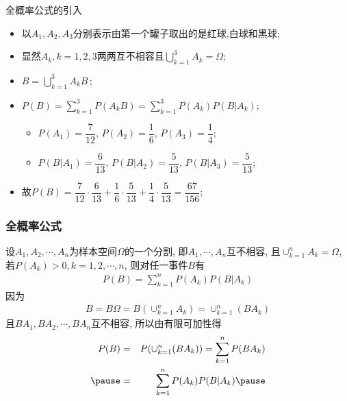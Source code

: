 \begin{frame}{全概率公式的引入}
	\begin{jieda}
	\begin{itemize}[<+-|alert@+>]
		\item 以$A_1,A_2,A_3$分别表示由第一个罐子取出的是红球,白球和黑球;
		\item 显然$A_k, k=1,2,3$两两互不相容且$\bigcup_{k=1}^3A_k=\Omega$;
		\item $B=\bigcup_{k=1}^{3}A_kB\,$;
		\item $ P(B)=\sum_{k=1}^{3} P(A_kB)=\sum_{k=1}^{3} P(A_k) P(B|A_k)$;
		\begin{itemize}
			\item $ P(A_1)=\dfrac{7}{12},\, P(A_2)=\dfrac{1}{6},\, P(A_3)=\dfrac{1}{4}$;
			\item $ P(B|A_1)=\dfrac{6}{13},\, P(B|A_2)=\dfrac{5}{13},\, P(B|A_3)=\dfrac{5}{13}$;
		\end{itemize}
	\item 故$ P(B)=\dfrac{7}{12}·\dfrac{6}{13}+\dfrac{1}{6}·\dfrac{5}{13}+\dfrac{1}{4}·\dfrac{5}{13}=\dfrac{67}{156};$
	\end{itemize}
	\end{jieda}
\end{frame}

\begin{frame}
  \frametitle{全概率公式}
  \begin{thm}[\textcolor{red}{全概率公式}] 设$A_1,A_2,\cdots,A_n$为样本空间$\Omega$的一个分割, 即$A_1,\cdots,A_n$互不相容, 且$\cup_{k=1}^nA_k=\Omega$, 若$P(A_k)>0, k=1,2,\cdots,n$, 则对任一事件$B$有
    \begin{eqnarray*}
      P(B)=\sum_{k=1}^nP(A_k)P(B|A_k)
    \end{eqnarray*}
    \pause \zheng 因为
    \begin{eqnarray*}
      B=B\Omega=B(\cup_{k=1}^nA_k)=\cup_{k=1}^n(BA_k)
    \end{eqnarray*}
    \pause 且$BA_1,BA_2,\cdots,BA_n$互不相容, 所以由有限可加性得
    \pause
    \begin{eqnarray*}
      P(B)&=&P(\cup_{k=1}^n(BA_k))=\sum_{k=1}^nP(BA_k)\\ \pause
          &=&\sum_{k=1}^nP(A_k)P(B|A_k)\pause
    \end{eqnarray*}
  \end{thm}
\end{frame}



